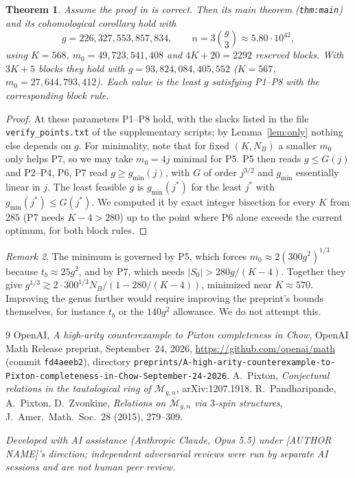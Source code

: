 \documentclass[11pt]{amsart}
\newtheorem{theorem}{Theorem}
\theoremstyle{remark}
\newtheorem{remark}[theorem]{Remark}
\newcommand{\Mbar}{\overline{\mathcal M}}
\begin{document}
\begin{theorem}\label{thm:main}
Assume the proof in \cite{OAI053} is correct. Then its main theorem (\texttt{thm:main}) and its cohomological corollary hold with
\[
 g=226{,}327{,}553{,}857{,}834,\qquad n=3\binom g3\approx5.80\cdot10^{42},
\]
using $K=568$, $m_0=49{,}723{,}541{,}408$ and $4K+20=2292$ reserved blocks. With $3K+5$ blocks they hold
with $g=93{,}824{,}084{,}405{,}552$ ($K=567$, $m_0=27{,}644{,}793{,}412$). Each value is the least $g$
satisfying P1--P8 with the corresponding block rule.
\end{theorem}
\begin{proof}
\sloppy At these parameters P1--P8 hold, with the slacks listed in the file
\texttt{verify\_points.txt} of the supplementary scripts;
by Lemma~\ref{lem:only} nothing else depends on $g$. For minimality, note that for fixed $(K,N_B)$ a
smaller $m_0$ only helps P7, so we may take $m_0=4j$ minimal for P5. P5 then reads $g\le G(j)$ and
P2--P4, P6, P7 read $g\ge g_{\min}(j)$, with $G$ of order $j^{3/2}$ and $g_{\min}$ essentially linear in
$j$. The least feasible $g$ is $g_{\min}(j^*)$ for the least $j^*$ with $g_{\min}(j^*)\le G(j^*)$.
We computed it by exact integer bisection for every $K$ from $285$ (P7 needs $K-4>280$) up to the point
where P6 alone exceeds the current optimum, for both block rules.
\end{proof}

\begin{remark}
The minimum is governed by P5, which forces $m_0\approx2(300g^2)^{1/3}$ because $t_b\approx25g^2$, and
by P7, which needs $|S_0|>280g/(K-4)$. Together they give
$g^{1/3}\gtrsim2\cdot300^{1/3}N_B/(1-280/(K-4))$, minimized near $K\approx570$. Improving the genus
further would require improving the preprint's bounds themselves, for instance $t_b$ or the
$140g^2$ allowance. We do not attempt this.
\end{remark}

\begin{thebibliography}{9}
 OpenAI, \emph{A high-arity counterexample to Pixton completeness in Chow},
 OpenAI Math Release preprint, September~24, 2026, \url{https://github.com/openai/math} (commit \texttt{fd4aeeb2}),
 directory \texttt{preprints/A-high-arity-counterexample-to-Pixton-completeness-in-Chow-September-24-2026}.
 A.~Pixton, \emph{Conjectural relations in the tautological ring of $\Mbar_{g,n}$}, arXiv:1207.1918.
 R.~Pandharipande, A.~Pixton, D.~Zvonkine, \emph{Relations on $\Mbar_{g,n}$ via $3$-spin structures},
 J.\ Amer.\ Math.\ Soc.\ 28 (2015), 279--309.
\end{thebibliography}

\noindent\emph{Developed with AI assistance (Anthropic Claude, Opus 5.5) under [AUTHOR NAME]'s direction;
independent adversarial reviews were run by separate AI sessions and are not human peer review.}
\end{document}
